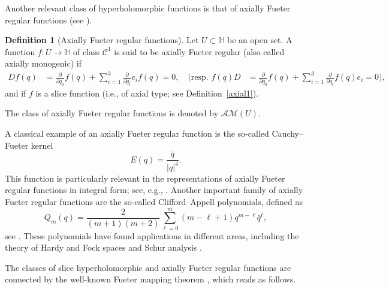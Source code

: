 \documentclass[reqno,11pt]{amsart}
\theoremstyle{definition}
\newtheorem{definition}[theorem]{Definition}
\begin{document}
\medskip



Another relevant class of hyperholomorphic functions is that of axially Fueter regular functions (see \cite{red, green}).
\begin{definition}[Axially Fueter regular functions]\label{DEFfueterregular}
Let $U \subset \mathbb{H}$ be an open set. A function $f:U\to\mathbb{H}$ of class $\mathcal{C}^1$
is said to be   axially Fueter regular (also called axially monogenic) if
\begin{align*}
	Df(q)&=\frac{\partial}{\partial{q_0}}f(q)+ \sum_{i=1}^3  \frac{\partial}{\partial{q_i}} e_if(q)= 0,\quad
	(\text{resp. }f(q)D&=\frac{\partial}{\partial{q_0}}f(q)+ \sum_{i=1}^3  \frac{\partial}{\partial{q_i}} f(q)e_i =0) ,
\end{align*}
and if $f$ is a slice function (i.e., of axial type; see Definition~\ref{axial1}).
\end{definition}
The class of  axially Fueter regular functions is denoted by  $\mathcal{AM}(U)$.


	
A classical example of an axially Fueter regular function is the so-called Cauchy--Fueter kernel
\begin{equation}
\label{Fueter}
E(q)=\frac{\bar q}{|q|^4}.
\end{equation}
This function is particularly relevant in the representations of axially Fueter regular functions in integral form; see, e.g., \cite[Ch. 2]{red}. Another important family of axially Fueter regular functions are the so-called Clifford--Appell polynomials, defined as
\begin{equation}
\label{ca}
Q_m(q)= \frac{2}{(m+1)(m+2)} \sum_{\ell=0}^{m}(m-\ell+1)q^{m-\ell} \bar{q}^{\ell},
\end{equation}
see \cite{CMF, CFM}. These polynomials have found applications in different areas, including the theory of Hardy and Fock spaces \cite{AKS3, DDG1} and Schur analysis \cite{ACDDS}.

The classes of slice hyperholomorphic and axially Fueter regular functions are connected by the well-known Fueter mapping theorem \cite{Fueter}, which reads as follows.
\end{document}

